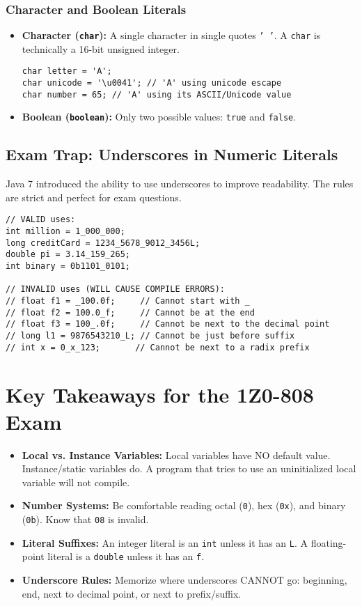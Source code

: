 \documentclass[12pt]{article}
\begin{document}
\begin{enumerate}[label=(\arabic*)]
\subsubsection*{Character and Boolean Literals}
\begin{itemize}
\item \textbf{Character (\texttt{char}):} A single character in single quotes \texttt{' '}. A \texttt{char} is technically a 16-bit unsigned integer.
\begin{verbatim}
char letter = 'A';
char unicode = '\u0041'; // 'A' using unicode escape
char number = 65; // 'A' using its ASCII/Unicode value
\end{verbatim}
\item \textbf{Boolean (\texttt{boolean}):} Only two possible values: \texttt{true} and \texttt{false}.
\end{itemize}

\subsection*{Exam Trap: Underscores in Numeric Literals}
Java 7 introduced the ability to use underscores to improve readability. The rules are strict and perfect for exam questions.
\begin{verbatim}
// VALID uses:
int million = 1_000_000;
long creditCard = 1234_5678_9012_3456L;
double pi = 3.14_159_265;
int binary = 0b1101_0101;

// INVALID uses (WILL CAUSE COMPILE ERRORS):
// float f1 = _100.0f;     // Cannot start with _
// float f2 = 100.0_f;     // Cannot be at the end
// float f3 = 100_.0f;     // Cannot be next to the decimal point
// long l1 = 9876543210_L; // Cannot be just before suffix
// int x = 0_x_123;       // Cannot be next to a radix prefix
\end{verbatim}

\section*{Key Takeaways for the 1Z0-808 Exam}
\begin{itemize}
\item \textbf{Local vs. Instance Variables:} Local variables have NO default value. Instance/static variables do. A program that tries to use an uninitialized local variable will not compile.
\item \textbf{Number Systems:} Be comfortable reading octal (\texttt{0}), hex (\texttt{0x}), and binary (\texttt{0b}). Know that \texttt{08} is invalid.
\item \textbf{Literal Suffixes:} An integer literal is an \texttt{int} unless it has an \texttt{L}. A floating-point literal is a \texttt{double} unless it has an \texttt{f}.
\item \textbf{Underscore Rules:} Memorize where underscores CANNOT go: beginning, end, next to decimal point, or next to prefix/suffix.
\end{itemize}
\end{enumerate}
\end{document}
